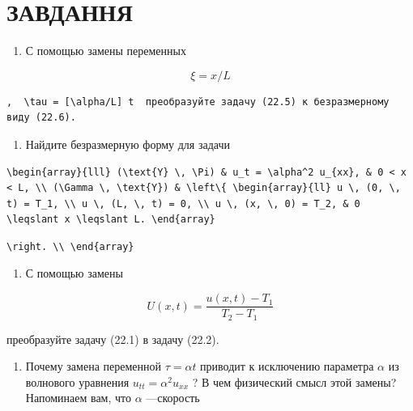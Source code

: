 \documentclass[
  ukrainian,
]{article}
\providecommand{\tightlist}{%
  \setlength{\itemsep}{0pt}\setlength{\parskip}{0pt}}
\begin{document}
\section{ЗАВДАННЯ}\label{ux437ux430ux432ux434ux430ux43dux43dux44f-9}

\begin{enumerate}
\def\labelenumi{\arabic{enumi}.}
\tightlist
\item
  С помощью замены переменных
\end{enumerate}

\[
\xi = x/L
\]

\begin{verbatim}
,  \tau = [\alpha/L] t  преобразуйте задачу (22.5) к безразмерному виду (22.6).
\end{verbatim}

\begin{enumerate}
\def\labelenumi{\arabic{enumi}.}
\setcounter{enumi}{1}
\tightlist
\item
  Найдите безразмерную форму для задачи
\end{enumerate}

\begin{verbatim}
\begin{array}{lll} (\text{Y} \, \Pi) & u_t = \alpha^2 u_{xx}, & 0 < x < L, \\ (\Gamma \, \text{Y}) & \left\{ \begin{array}{ll} u \, (0, \, t) = T_1, \\ u \, (L, \, t) = 0, \\ u \, (x, \, 0) = T_2, & 0 \leqslant x \leqslant L. \end{array}
\end{verbatim}

\begin{verbatim}
\right. \\ \end{array}
\end{verbatim}

\begin{enumerate}
\def\labelenumi{\arabic{enumi}.}
\setcounter{enumi}{2}
\tightlist
\item
  С помощью замены
\end{enumerate}

\[
U(x, t) = \frac{u(x, t) - T_1}{T_2 - T_1}
\]

преобразуйте задачу (22.1) в задачу (22.2).

\begin{enumerate}
\def\labelenumi{\arabic{enumi}.}
\setcounter{enumi}{3}
\tightlist
\item
  Почему замена переменной \(\tau = \alpha t\) приводит к исключению
  параметра \(\alpha\) из волнового уравнения
  \(u_{tt} = \alpha^2 u_{xx}\) ? В чем физический смысл этой замены?
  Напоминаем вам, что \(\alpha\) ---скорость
\end{enumerate}
\end{document}
